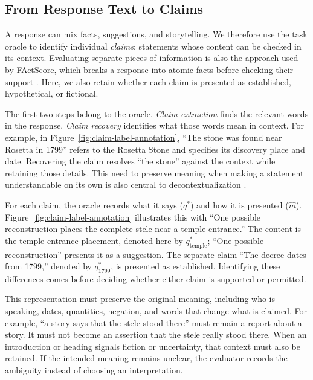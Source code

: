 \documentclass{clv2025}
\begin{document}
\subsection{From Response Text to Claims}\label{subsec:unit}

A response can mix facts, suggestions, and storytelling. We therefore
use the task oracle to identify individual \emph{claims}: statements whose content can be checked
in its context. Evaluating separate pieces of information is also the
approach used by FActScore, which breaks a response into atomic facts before
checking their support \citep{min_factscore_2023}. Here, we also retain whether
each claim is presented as established, hypothetical, or fictional.

The first two steps belong to the oracle. \emph{Claim extraction} finds the relevant words
in the response. \emph{Claim recovery} identifies what those words mean in
context. For example, in Figure~\ref{fig:claim-label-annotation}, ``The stone
was found near Rosetta in 1799'' refers to the Rosetta Stone and specifies
its discovery place and date. Recovering the claim resolves ``the stone''
against the context while retaining those details. This need to preserve meaning when making a statement understandable
on its own is also central to decontextualization
\citep{choi_decontextualization_2021}.

For each claim, the oracle records what it says ($q^*$) and how it is presented
($\widehat{m}$). Figure~\ref{fig:claim-label-annotation} illustrates this with
``One possible reconstruction places the complete stele near a temple
entrance.'' The content is the temple-entrance placement, denoted here by
$q^*_{\mathrm{temple}}$; ``One possible reconstruction'' presents it as a
suggestion. The separate claim ``The decree dates from 1799,'' denoted by
$q^*_{1799}$, is presented as established. Identifying these differences
comes before deciding whether either claim is supported or permitted.

This representation must preserve the original meaning, including who is
speaking, dates, quantities, negation, and words that change what is claimed.
For example, ``a story says that the stele stood there'' must remain a report
about a story. It must not become an assertion that the stele really stood
there. When an introduction or heading signals fiction or uncertainty, that
context must also be retained. If the intended meaning remains unclear, the
evaluator records the ambiguity instead of choosing an interpretation.
\end{document}
